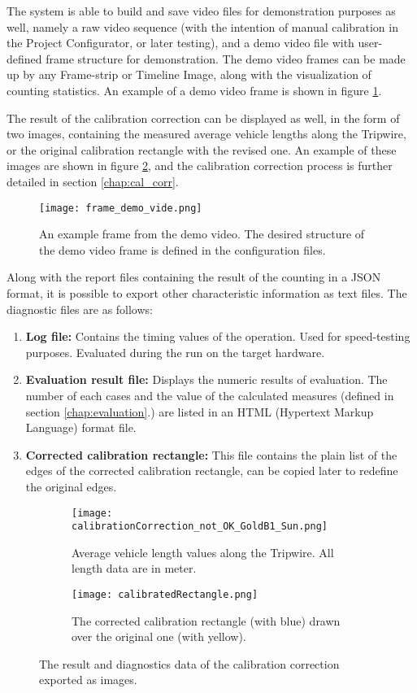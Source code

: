 The system is able to build and save video files for demonstration purposes as well, namely a raw video sequence (with the intention of manual calibration in the Project Configurator, or later testing), and a demo video file with user-defined frame structure for demonstration.
The demo video frames can be made up by any Frame-strip or Timeline Image, along with the visualization of counting statistics.
An example of a demo video frame is shown in figure \ref{fig:demo_video}.

The result of the calibration correction can be displayed as well, in the form of two images, containing the measured average vehicle lengths along the Tripwire, or the original calibration rectangle with the revised one. 
An example of these images are shown in figure \ref{fig:cal_corr_example}, and the calibration correction process is further detailed in section \ref{chap:cal_corr}.

\begin{figure}[!h]
	\centering
	\texttt{[image: frame\_demo\_vide.png]}
	\caption{An example frame from the demo video. The desired structure of the demo video frame is defined in the configuration files.  \label{fig:demo_video}}
\end{figure}

Along with the report files containing the result of the counting in a JSON format, it is possible to export other characteristic information as text files.
The diagnostic files are as follows:
\begin{enumerate}
	\item \textbf{Log file: } Contains the timing values of the operation. Used for speed-testing purposes. Evaluated during the run on the target hardware.
	\item \textbf{Evaluation result file: } Displays the numeric results of evaluation. The number of each cases and the value of the calculated measures (defined in section \ref{chap:evaluation}.) are listed in an HTML (Hypertext Markup Language) format file.
	\item \textbf{Corrected calibration rectangle: } This file contains the plain list of the edges of the corrected calibration rectangle, can be copied later to redefine the original edges.
\end{enumerate}

\begin{figure}[!h]
	\centering
	\begin{subfigure}[b]{0.4\textwidth}
		\texttt{[image: calibrationCorrection\_not\_OK\_GoldB1\_Sun.png]}
		\caption{Average vehicle length values along the Tripwire. All length data are in meter.}
	\end{subfigure}
	\quad
	\begin{subfigure}[b]{0.4\textwidth}
		\texttt{[image: calibratedRectangle.png]}
		\caption{The corrected calibration rectangle (with blue) drawn over the original one (with yellow).}
	\end{subfigure}
	\caption{The result and diagnostics data of the calibration correction exported as images.\label{fig:cal_corr_example}}
\end{figure}

